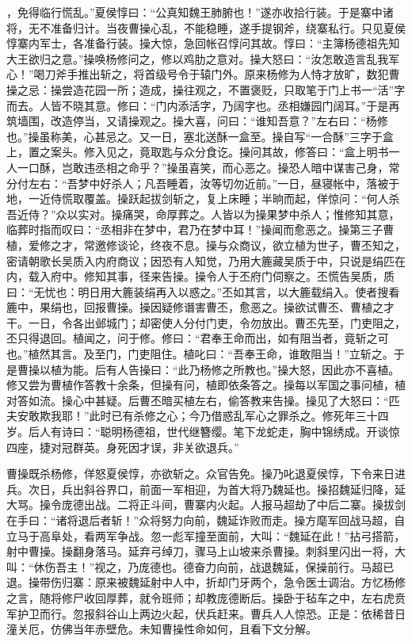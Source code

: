 ，免得临行慌乱。”夏侯惇曰：“公真知魏王肺腑也！”遂亦收拾行装。于是寨中诸将，无不准备归计。当夜曹操心乱，不能稳睡，遂手提钢斧，绕寨私行。只见夏侯惇寨内军士，各准备行装。操大惊，急回帐召惇问其故。惇曰：“主簿杨德祖先知大王欲归之意。”操唤杨修问之，修以鸡肋之意对。操大怒曰：“汝怎敢造言乱我军心！”喝刀斧手推出斩之，将首级号令于辕门外。原来杨修为人恃才放旷，数犯曹操之忌：操尝造花园一所；造成，操往观之，不置褒贬，只取笔于门上书一“活”字而去。人皆不晓其意。修曰：“门内添活字，乃阔字也。丞相嫌园门阔耳。”于是再筑墙围，改造停当，又请操观之。操大喜，问曰：“谁知吾意？”左右曰：“杨修也。”操虽称美，心甚忌之。又一日，塞北送酥一盒至。操自写“一合酥”三字于盒上，置之案头。修入见之，竟取匙与众分食讫。操问其故，修答曰：“盒上明书一人一口酥，岂敢违丞相之命乎？”操虽喜笑，而心恶之。操恐人暗中谋害己身，常分付左右：“吾梦中好杀人；凡吾睡着，汝等切勿近前。”一日，昼寝帐中，落被于地，一近侍慌取覆盖。操跃起拔剑斩之，复上床睡；半晌而起，佯惊问：“何人杀吾近侍？”众以实对。操痛哭，命厚葬之。人皆以为操果梦中杀人；惟修知其意，临葬时指而叹曰：“丞相非在梦中，君乃在梦中耳！”操闻而愈恶之。操第三子曹植，爱修之才，常邀修谈论，终夜不息。操与众商议，欲立植为世子，曹丕知之，密请朝歌长吴质入内府商议；因恐有人知觉，乃用大簏藏吴质于中，只说是绢匹在内，载入府中。修知其事，径来告操。操令人于丕府门伺察之。丕慌告吴质，质曰：“无忧也：明日用大簏装绢再入以惑之。”丕如其言，以大簏载绢入。使者搜看簏中，果绢也，回报曹操。操因疑修谮害曹丕，愈恶之。操欲试曹丕、曹植之才干。一日，令各出邺城门；却密使人分付门吏，令勿放出。曹丕先至，门吏阻之，丕只得退回。植闻之，问于修。修曰：“君奉王命而出，如有阻当者，竟斩之可也。”植然其言。及至门，门吏阻住。植叱曰：“吾奉王命，谁敢阻当！”立斩之。于是曹操以植为能。后有人告操曰：“此乃杨修之所教也。”操大怒，因此亦不喜植。修又尝为曹植作答教十余条，但操有问，植即依条答之。操每以军国之事问植，植对答如流。操心中甚疑。后曹丕暗买植左右，偷答教来告操。操见了大怒曰：“匹夫安敢欺我耶！”此时已有杀修之心；今乃借惑乱军心之罪杀之。修死年三十四岁。后人有诗曰：“聪明杨德祖，世代继簪缨。笔下龙蛇走，胸中锦绣成。开谈惊四座，捷对冠群英。身死因才误，非关欲退兵。”

曹操既杀杨修，佯怒夏侯惇，亦欲斩之。众官告免。操乃叱退夏侯惇，下令来日进兵。次日，兵出斜谷界口，前面一军相迎，为首大将乃魏延也。操招魏延归降，延大骂。操令庞德出战。二将正斗间，曹寨内火起。人报马超劫了中后二寨。操拔剑在手曰：“诸将退后者斩！”众将努力向前，魏延诈败而走。操方麾军回战马超，自立马于高阜处，看两军争战。忽一彪军撞至面前，大叫：“魏延在此！”拈弓搭箭，射中曹操。操翻身落马。延弃弓绰刀，骤马上山坡来杀曹操。刺斜里闪出一将，大叫：“休伤吾主！”视之，乃庞德也。德奋力向前，战退魏延，保操前行。马超已退。操带伤归寨：原来被魏延射中人中，折却门牙两个，急令医士调治。方忆杨修之言，随将修尸收回厚葬，就令班师；却教庞德断后。操卧于毡车之中，左右虎贲军护卫而行。忽报斜谷山上两边火起，伏兵赶来。曹兵人人惊恐。正是：依稀昔日潼关厄，仿佛当年赤壁危。未知曹操性命如何，且看下文分解。